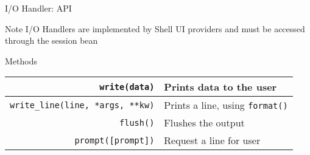 \begin{frame}{I/O Handler: API}
\begin{small}
\begin{exampleblock}{Note}
I/O Handlers are implemented by Shell UI providers and must be accessed through the session bean
\end{exampleblock}

\begin{block}{Methods}
\begin{center}
\begin{tabular}{rl}
\texttt{\scriptsize write(data)} & Prints data to the user \\
\hline
\texttt{\scriptsize write\_line(line, *args, **kw)} & Prints a line, using \texttt{format()} \\
\hline
\texttt{\scriptsize flush()} & Flushes the output \\
\hline
\texttt{\scriptsize prompt([prompt])} & Request a line for user \\
\end{tabular}
\end{center}
\end{block}
\end{small}
\end{frame}
